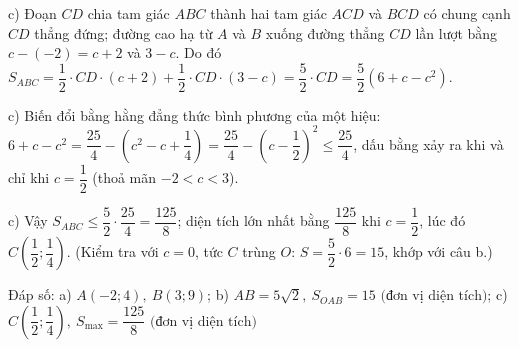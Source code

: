 \begin{problem}[9DS-HSB2-031]
\begin{solution}
c) Đoạn $CD$ chia tam giác $ABC$ thành hai tam giác $ACD$ và $BCD$ có chung cạnh $CD$ thẳng đứng; đường cao hạ từ $A$ và $B$ xuống đường thẳng $CD$ lần lượt bằng $c - (-2) = c + 2$ và $3 - c$. Do đó $S_{ABC} = \dfrac{1}{2} \cdot CD \cdot (c + 2) + \dfrac{1}{2} \cdot CD \cdot (3 - c) = \dfrac{5}{2} \cdot CD = \dfrac{5}{2}\left(6 + c - c^2\right)$.

c) Biến đổi bằng hằng đẳng thức bình phương của một hiệu: $6 + c - c^2 = \dfrac{25}{4} - \left(c^2 - c + \dfrac{1}{4}\right) = \dfrac{25}{4} - \left(c - \dfrac{1}{2}\right)^2 \leq \dfrac{25}{4}$, dấu bằng xảy ra khi và chỉ khi $c = \dfrac{1}{2}$ (thoả mãn $-2 < c < 3$).

c) Vậy $S_{ABC} \leq \dfrac{5}{2} \cdot \dfrac{25}{4} = \dfrac{125}{8}$; diện tích lớn nhất bằng $\dfrac{125}{8}$ khi $c = \dfrac{1}{2}$, lúc đó $C\left(\dfrac{1}{2}; \dfrac{1}{4}\right)$. (Kiểm tra với $c = 0$, tức $C$ trùng $O$: $S = \dfrac{5}{2} \cdot 6 = 15$, khớp với câu b.)

Đáp số: a) $\boxed{A(-2; 4),\ B(3; 9)}$; b) $\boxed{AB = 5\sqrt{2},\ S_{OAB} = 15 \text{ (đơn vị diện tích)}}$; c) $\boxed{C\left(\dfrac{1}{2}; \dfrac{1}{4}\right),\ S_{\max} = \dfrac{125}{8} \text{ (đơn vị diện tích)}}$
\end{solution}
\end{problem}


